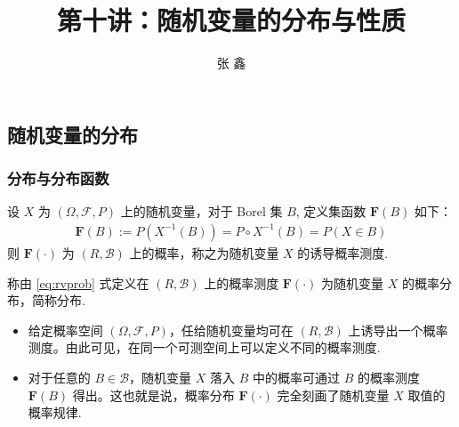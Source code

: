 \documentclass[Prob-All.tex]{subfiles}
\begin{document}
\subsection{随机变量的分布}
\title [概率论]{第十讲：随机变量的分布与性质}
\author [张鑫 {\rm Email: xzhangseu@seu.edu.cn} ]{\large 张 鑫}
\date{}

{ 
	\begin{frame}
		\titlepage
	\end{frame}
}

\addtocounter{framenumber}{-3}  %

\begin{frame}
	\frametitle{分布与分布函数}
	\begin{thm}
		设 $X$ 为 $(\Omega,\mathcal{F},P)$ 上的随机变量，对于 Borel 集 $B$, 定义集函数 $\mathbf{F}(B)$ 如下：
		\begin{eqnarray}\label{eq:rvprob}
			\mathbf{F}(B):=P(X^{-1}(B))=P\circ X^{-1}(B)=P(X\in B)
		\end{eqnarray}
		则 $\mathbf{F}(\cdot)$ 为 $(R,\mathcal{B})$ 上的概率，称之为随机变量 $X$ 的诱导概率测度.
	\end{thm}
	\vspace{0.2cm}
	\pause
	\begin{defi}
		称由 \eqref{eq:rvprob} 式定义在 $(R,\mathcal{B})$ 上的概率测度 $\mathbf{F}(\cdot)$ 为随机变量 $X$ 的概率分布，简称分布.
	\end{defi}
	\pause
	\vspace{0.2cm}
	\begin{itemize}[<+-|alert@+>]
		\item 给定概率空间 $(\Omega,\mathcal{F},P)$，任给随机变量均可在 $(R,\mathcal{B})$ 上诱导出一个概率测度。由此可见，在同一个可测空间上可以定义不同的概率测度.
		\item 对于任意的 $B\in \mathcal{B}$，随机变量 $X$ 落入 $B$ 中的概率可通过 $B$ 的概率测度 $\mathbf{F}(B)$ 得出。这也就是说，概率分布 $\mathbf{F}(\cdot)$ 完全刻画了随机变量 $X$ 取值的概率规律.
	\end{itemize}
\end{frame}
\end{document}
